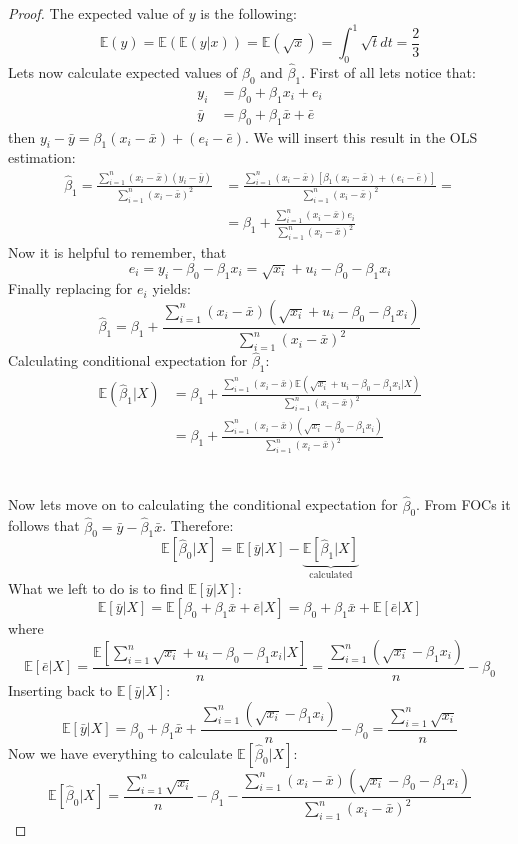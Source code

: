\documentclass[12pt,reqno]{amsart}
\theoremstyle{plain}
\newcommand{\E}{\mathbb{E}}
\newcommand{\s}{\sum_{i=1}^{n}}
\begin{document}
\begin{proof}
    The expected value of $ y $ is the following:
    \[\E(y) = \E(\E(y|x)) = \E(\sqrt{x}) = \int_{0}^{1}\sqrt{t}dt = \frac{2}{3}\]
    Lets now calculate expected values of $ \hat{\beta}_{0} $ and $ \hat{\beta}_{1} $. First of all
    lets notice that:
    \begin{align*}
        y_i    & = \beta_{0} + \beta_{1}x_{i} + e_i       \\
        \bar y & = \beta_{0} + \beta_{1}\bar{x} + \bar{e}
    \end{align*}
    then $ y_i - \bar{y} = \beta_{1}(x_{i} - \bar{x}) + (e_{i} - \bar{e}) $. We will insert this result
    in the OLS estimation:
    \begin{align*}
        \hat{\beta}_{1} = \frac{\s (x_{i} - \bar x)(y_{i} - \bar y)}{\s (x_i - \bar{x})^{2}} & =
        \frac{\s (x_i-\bar{x})\left[  \beta_{1}(x_{i} - \bar{x}) + (e_{i} - \bar{e})\right]}{\s (x_i - \bar{x})^{2}} =                                            \\
                                                                                             & = \beta_{1} + \frac{\s (x_i-\bar{x})e_{i}}{\s (x_i - \bar{x})^{2}}
    \end{align*}
    Now it is helpful to remember, that
    \[ e_{i} = y_{i} - \beta_{0} - \beta_{1}x_{i} = \sqrt{x_{i}} + u_{i} - \beta_{0} - \beta_{1}x_{i} \]
    Finally replacing for $ e_{i} $ yields:
    \[
        \hat{\beta}_{1} = \beta_{1} + \frac{\s (x_i-\bar{x})(\sqrt{x_{i}} + u_{i} - \beta_{0} - \beta_{1}x_{i})}{\s (x_i - \bar{x})^{2}}
    \]
    Calculating conditional expectation for $ \hat\beta_{1} $:
    \begin{align*}
        \E(\hat\beta_1 |X) & = \beta_{1} + \frac{\s (x_i-\bar{x})\E(\sqrt{x_{i}} + u_{i} - \beta_{0} - \beta_{1}x_{i} | X)}{\s (x_i - \bar{x})^{2}} \\
                           & = \beta_{1} + \frac{\s (x_i-\bar{x})(\sqrt{x_{i}} - \beta_{0} - \beta_{1}x_{i})}{\s (x_i - \bar{x})^{2}}
    \end{align*}
    \\\\
    Now lets move on to calculating the conditional expectation for $ \hat\beta_{0} $. From FOCs it
    follows that $ \hat{\beta}_{0} = \bar{y}-\hat{\beta}_{1} \bar{x} $. Therefore:
    \[
        \E[\hat{\beta}_{0} | X] =  \E [\bar{y} | X] - \underbrace{\E[\hat\beta_1 |X]}_{\text{calculated}}
    \]
    What we left to do is to find $ \E [\bar{y} | X] $:
    \[\E [\bar{y} | X] = \E [\beta_{0} + \beta_{1}\bar{x} + \bar{e} | X] = \beta_{0} + \beta_{1}\bar{x} + \E[\bar{e}| X]
    \]
    where
    \[
        \E[\bar{e}|X] = \frac{\E[ \s \sqrt{x_i} + u_i - \beta_0 - \beta_{1}x_i|X]}{n} = \frac{\s \left(\sqrt{x_i} -\beta_1x_i\right)}{n} - \beta_0
    \]
    Inserting back to $ \E[\bar{y}|X] $:
    \[
        \E[\bar{y} | X] = \beta_{0} + \beta_{1}\bar{x} + \frac{\s \left(\sqrt{x_i} -\beta_1x_i\right)}{n} - \beta_0 = \frac{\s \sqrt{x_i}}{n}
    \]
    Now we have everything to calculate $ \E[\hat{\beta}_{0} |X] $:
    \[
        \E[\hat{\beta}_{0} | X] =  \frac{\s \sqrt{x_i}}{n} - \beta_{1} - \frac{\s (x_i-\bar{x})(\sqrt{x_{i}} - \beta_{0} - \beta_{1}x_{i})}{\s (x_i - \bar{x})^{2}}
    \]
\end{proof}
\end{document}
